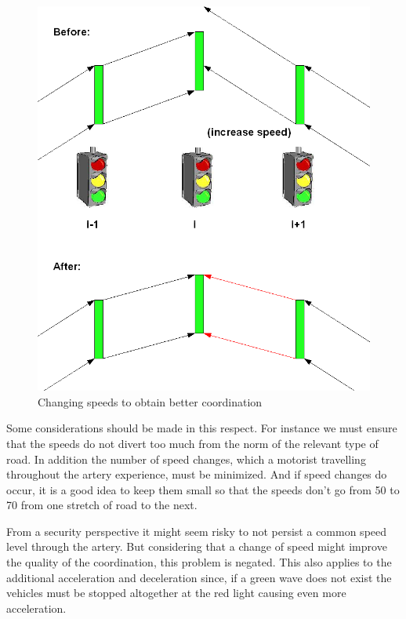 \begin{figure}[htbp]
\centering
\includegraphics[scale=0.3]{change_speed.png}
\caption{Changing speeds to obtain better coordination}
\label{fig:change_speed}
\end{figure}

Some considerations should be made in this respect. For instance we must ensure that the speeds do not divert too much from the norm of the relevant type of road. In addition the number of speed changes, which a motorist travelling throughout the artery experience, must be minimized. And if speed changes do occur, it is a good idea to keep them small so that the speeds don't go from 50 to 70 from one stretch of road to the next.

From a security perspective it might seem risky to not persist a common speed level through the artery. But considering that a change of speed might improve the quality of the coordination, this problem is negated. This also applies to the additional acceleration and deceleration since, if a green wave does not exist the vehicles must be stopped altogether at the red light causing even more acceleration.

